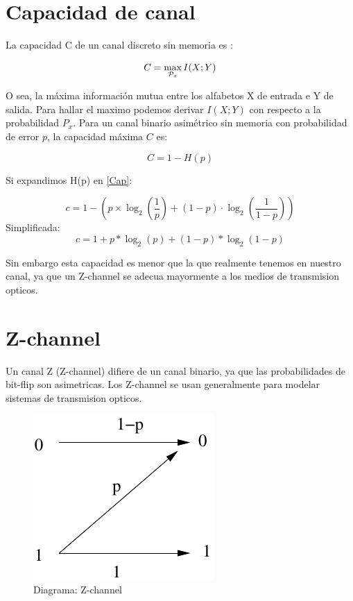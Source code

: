 \documentclass[a4paper,12pt]{article}
\begin{document}
\section{Capacidad de canal}

La capacidad C de un canal discreto sin memoria es :

\begin{equation}
C = \max_{{\cal{P}}_x} I(X;Y) 
\end{equation}

O sea, la máxima información mutua entre los alfabetos X de entrada e Y de salida.
Para hallar el maximo podemos derivar $I(X;Y)$ con respecto a la probabilidad $P_x$.
Para un canal binario asimétrico sin memoria con probabilidad de error $p$, la capacidad máxima $C$ es:

\begin{equation}\label{Cap}
C = 1 - H(p) 
\end{equation}

Si expandimos H(p) en \ref{Cap}:

$$ c = 1-\left(p \times \log_2\left(\frac{1}{p}\right) + (1-p) \cdot \log_2\left(\frac{1}{1-p}\right)\right) $$
Simplificada:
$$ c = 1 + p * \log_2(p) + (1 - p) * \log_2(1-p) $$

Sin embargo esta capacidad es menor que la que realmente tenemos en nuestro canal, ya que un Z-channel se adecua mayormente a los medios de transmision opticos.

\section{Z-channel}

Un canal Z (Z-channel) difiere de un canal binario, ya que las probabilidades de bit-flip son asimetricas.
Los Z-channel se usan generalmente para modelar sistemas de transmision opticos.

\begin{figure}[th]
  \begin{center}
    \includegraphics[scale=0.5]{zchannel}
  \end{center}
  \caption{Diagrama: Z-channel}
  \label{fig:Gal}
\end{figure}
\end{document}
